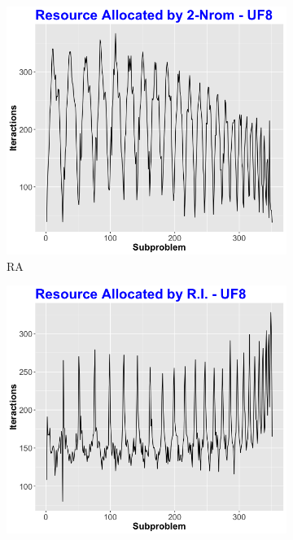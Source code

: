 \begin{figure}[!t]
	
	\begin{subfigure}[b]{0.33\textwidth}
		\centering
		\includegraphics[width=1\textwidth, height=1\textwidth]{images/Ra-norm-uf8}
		\caption{RA}
	\end{subfigure}
	\begin{subfigure}[b]{0.33\textwidth}
		\centering
		\includegraphics[width=1\textwidth, height=1\textwidth]{images/Ra-gra-uf8}

\end{subfigure}
\end{figure}
